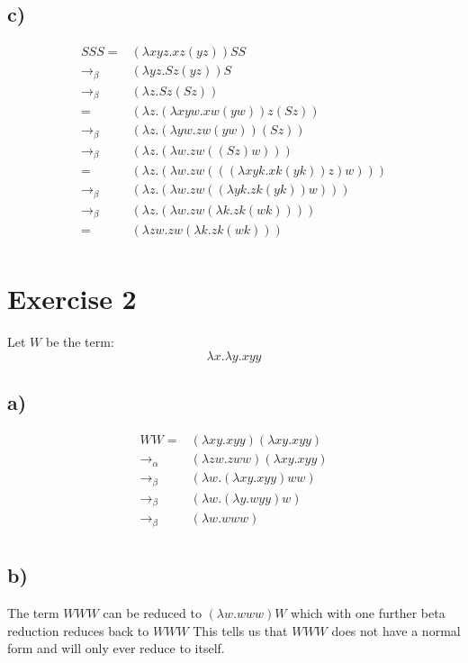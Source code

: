 \documentclass[11pt]{article}
\begin{document}
\subsection{c)}

\begin{align*}
  SSS =& (\lambda xyz.xz(yz))SS\\
  \to_\beta& (\lambda yz.Sz(yz))S\\
  \to_\beta& (\lambda z.Sz(Sz))\\
  =& (\lambda z.(\lambda xyw.xw(yw))z(Sz))\\
  \to_\beta& (\lambda z.(\lambda yw.zw(yw))(Sz))\\
  \to_\beta& (\lambda z.(\lambda w.zw((Sz)w)))\\
  =& (\lambda z.(\lambda w.zw(((\lambda xyk.xk(yk))z)w)))\\
  \to_\beta& (\lambda z.(\lambda w.zw((\lambda yk.zk(yk))w)))\\
  \to_\beta& (\lambda z.(\lambda w.zw(\lambda k.zk(wk))))\\
  =& (\lambda zw.zw(\lambda k.zk(wk)))\\
\end{align*}

\section{Exercise 2}

Let $W$ be the term:
$$ \lambda x.\lambda y.xyy $$

\subsection{a)}
\begin{align*}
  WW =& (\lambda xy.xyy)(\lambda xy.xyy)\\
  \to_\alpha& (\lambda zw.zww)(\lambda xy.xyy)\\
  \to_\beta& (\lambda w.(\lambda xy.xyy)ww)\\
  \to_\beta& (\lambda w.(\lambda y.wyy)w)\\
  \to_\beta& (\lambda w.www)\\
\end{align*}

\subsection{b)}
The term $WWW$ can be reduced to $(\lambda w.www)W$ which with one further beta reduction reduces back to $WWW$
This tells us that $WWW$ does not have a normal form and will only ever reduce to itself.
\end{document}
